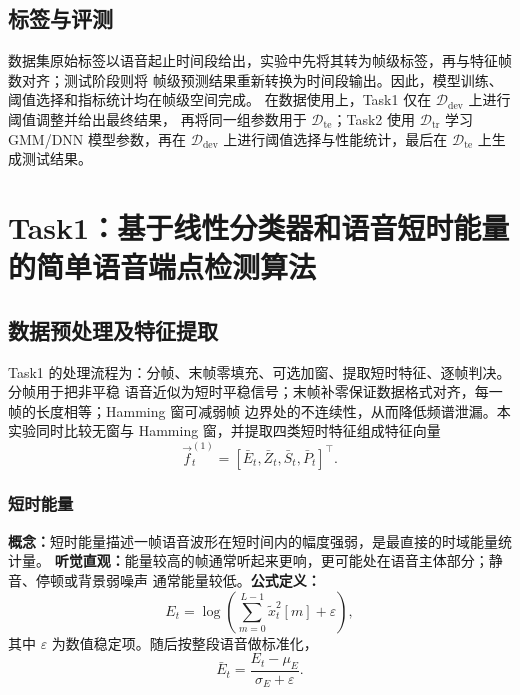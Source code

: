 \documentclass[a4paper]{article}
\begin{document}
\subsection{标签与评测}

数据集原始标签以语音起止时间段给出，实验中先将其转为帧级标签，再与特征帧数对齐；测试阶段则将
帧级预测结果重新转换为时间段输出。因此，模型训练、阈值选择和指标统计均在帧级空间完成。
在数据使用上，Task1 仅在 $\mathcal{D}_{\text{dev}}$ 上进行阈值调整并给出最终结果，
再将同一组参数用于 $\mathcal{D}_{\text{te}}$；Task2 使用 $\mathcal{D}_{\text{tr}}$ 学习
GMM/DNN 模型参数，再在 $\mathcal{D}_{\text{dev}}$ 上进行阈值选择与性能统计，最后在
$\mathcal{D}_{\text{te}}$ 上生成测试结果。

\section{Task1：基于线性分类器和语音短时能量的简单语音端点检测算法}

\subsection{数据预处理及特征提取}

Task1 的处理流程为：分帧、末帧零填充、可选加窗、提取短时特征、逐帧判决。分帧用于把非平稳
语音近似为短时平稳信号；末帧补零保证数据格式对齐，每一帧的长度相等；Hamming 窗可减弱帧
边界处的不连续性，从而降低频谱泄漏。本实验同时比较无窗与 Hamming 窗，并提取四类短时特征组成特征向量
\begin{equation}
  \vec{f}_t^{(1)} = [\bar{E}_t, \bar{Z}_t, \bar{S}_t, \bar{P}_t]^\top.
\end{equation}

\subsubsection{短时能量}
\label{sec:task1-features}

\textbf{概念：}短时能量描述一帧语音波形在短时间内的幅度强弱，是最直接的时域能量统计量。
\textbf{听觉直观：}能量较高的帧通常听起来更响，更可能处在语音主体部分；静音、停顿或背景弱噪声
通常能量较低。\textbf{公式定义：}
\begin{equation}
  E_t = \log \left( \sum_{m=0}^{L-1} \tilde{x}_t^2[m] + \varepsilon \right),
\end{equation}
其中 $\varepsilon$ 为数值稳定项。随后按整段语音做标准化，
\begin{equation}
  \bar{E}_t = \frac{E_t-\mu_E}{\sigma_E+\varepsilon}.
\end{equation}
\end{document}
